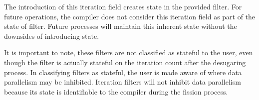 The introduction of this iteration field creates state in the provided filter.  For future operations, the compiler does not consider this iteration field as part of the state of filter.  Future processes will maintain this inherent state without the downsides of introducing state.

It is important to note, these filters are not classified as stateful to the user, even though the filter is actually stateful on the iteration count after the desugaring process.  In classifying filters as stateful, the user is made aware of where data parallelism may be inhibited.  Iteration filters will not inhibit data parallelism because its state is identifiable to the compiler during the fission process.   

